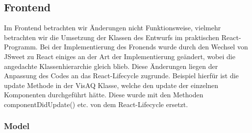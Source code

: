 \subsection{Frontend}
Im Frontend betrachten wir Änderungen nicht Funktionsweise, vielmehr betrachten wir die Umsetzung der Klassen des Entwurfs im praktischen React-Programm.
Bei der Implementierung des Fronends wurde durch den Wechsel von JSweet zu React einiges an der Art der Implementierung geändert, wobei die angedachte Klassenhierarchie gleich blieb.
Diese Änderungen liegen der Anpassung des Codes an das \gls{React-Lifecycle} zugrunde. Beispiel hierfür ist die update Methode in der VisAQ Klasse, welche den update der einzelnen Komponenten
durchgeführt hätte. Diese wurde mit den Methoden componentDidUpdate() etc. von dem \gls{React-Lifecycle} ersetzt. 

\subsubsection{Model}
\toJSON
{}
\toJSON
{}
\toJSON
{}
\toJSON
{}
\toJSON
{}
\toJSON
{}
\toJSON
{}
\toJSON
{}
\toJSON
{}
\toJSON
{}
\toJSON
{}
\toJSON

